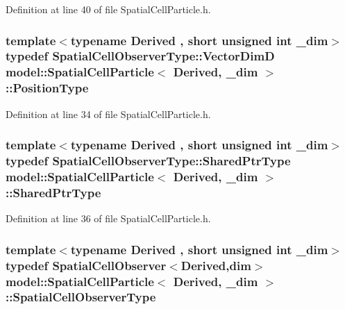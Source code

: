 Definition at line 40 of file Spatial\+Cell\+Particle.\+h.

\hypertarget{structmodel_1_1_spatial_cell_particle_a7ab8ba2de07a16fc3ec86b77c84581ab}{}
\subsubsection[{Position\+Type}]{\setlength{\rightskip}{0pt plus 5cm}template$<$typename Derived , short unsigned int \+\_\+dim$>$ typedef {\bf Spatial\+Cell\+Observer\+Type\+::\+Vector\+Dim\+D} {\bf model\+::\+Spatial\+Cell\+Particle}$<$ Derived, \+\_\+dim $>$\+::{\bf Position\+Type}}\label{structmodel_1_1_spatial_cell_particle_a7ab8ba2de07a16fc3ec86b77c84581ab}


Definition at line 34 of file Spatial\+Cell\+Particle.\+h.

\hypertarget{structmodel_1_1_spatial_cell_particle_af80891fc642ed8010429583dfb1b1009}{}
\subsubsection[{Shared\+Ptr\+Type}]{\setlength{\rightskip}{0pt plus 5cm}template$<$typename Derived , short unsigned int \+\_\+dim$>$ typedef {\bf Spatial\+Cell\+Observer\+Type\+::\+Shared\+Ptr\+Type} {\bf model\+::\+Spatial\+Cell\+Particle}$<$ Derived, \+\_\+dim $>$\+::{\bf Shared\+Ptr\+Type}}\label{structmodel_1_1_spatial_cell_particle_af80891fc642ed8010429583dfb1b1009}


Definition at line 36 of file Spatial\+Cell\+Particle.\+h.

\hypertarget{structmodel_1_1_spatial_cell_particle_ad819afaadf1701d46001ccf094a2f677}{}
\subsubsection[{Spatial\+Cell\+Observer\+Type}]{\setlength{\rightskip}{0pt plus 5cm}template$<$typename Derived , short unsigned int \+\_\+dim$>$ typedef {\bf Spatial\+Cell\+Observer}$<$Derived,{\bf dim}$>$ {\bf model\+::\+Spatial\+Cell\+Particle}$<$ Derived, \+\_\+dim $>$\+::{\bf Spatial\+Cell\+Observer\+Type}}\label{structmodel_1_1_spatial_cell_particle_ad819afaadf1701d46001ccf094a2f677}


